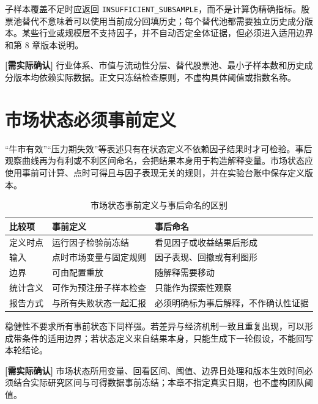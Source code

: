 子样本覆盖不足时应返回 \texttt{INSUFFICIENT\_SUBSAMPLE}，而不是计算伪精确指标。股票池替代不意味着可以使用当前成分回填历史；每个替代池都需要独立历史成分版本。某些行业或规模层不支持因子，并不自动否定全体证据，但必须进入适用边界和第 8 章版本说明。

\begin{confirmbox}
\textbf{[需实际确认]} 行业体系、市值与流动性分层、替代股票池、最小子样本数和历史成分版本均依赖实际数据。正文只冻结检查原则，不虚构具体阈值或指数名称。
\end{confirmbox}

\section{市场状态必须事前定义}

“牛市有效”“压力期失效”等表述只有在状态定义不依赖因子结果时才可检验。事后观察曲线再为有利或不利区间命名，会把结果本身用于构造解释变量。市场状态应使用事前可计算、点时可得且与因子表现无关的规则，并在实验台账中保存定义版本。

\begin{table}[htbp]
  \centering
  \small
  \caption{市场状态事前定义与事后命名的区别}
  \label{tab:ch07-regime-definition}
  \begin{tabularx}{\textwidth}{p{2.4cm} Y Y}
    \toprule
    比较项 & 事前定义 & 事后命名 \\
    \midrule
    定义时点 & 运行因子检验前冻结 & 看见因子或收益结果后形成 \\
    输入 & 点时市场变量与固定规则 & 因子表现、回撤或有利图形 \\
    边界 & 可由配置重放 & 随解释需要移动 \\
    统计含义 & 可作为预注册子样本检查 & 只能作为探索性观察 \\
    报告方式 & 与所有失败状态一起汇报 & 必须明确标为事后解释，不作确认性证据 \\
    \bottomrule
  \end{tabularx}
\end{table}

稳健性不要求所有事前状态下同样强。若差异与经济机制一致且重复出现，可以形成带条件的适用边界；若状态定义来自结果本身，只能生成下一轮假设，不能回写本轮结论。

\begin{confirmbox}
\textbf{[需实际确认]} 市场状态所用变量、回看区间、阈值、边界日处理和版本生效时间必须结合实际研究区间与可得数据事前冻结；本章不指定真实日期，也不虚构团队阈值。
\end{confirmbox}

